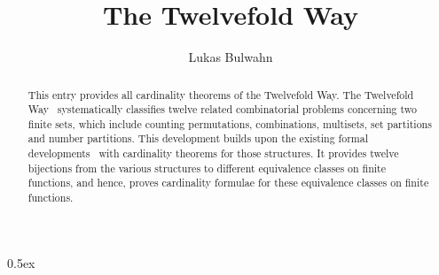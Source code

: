 \documentclass[11pt,a4paper]{article}
\begin{document}
\title{The Twelvefold Way}
\author{Lukas Bulwahn}
\maketitle

\begin{abstract}

This entry provides all cardinality theorems of the Twelvefold Way.
The Twelvefold Way~\cite{bogart-2004, stanley-2012, wikipedia:Twelvefold-Way}
systematically classifies twelve related combinatorial problems
concerning two finite sets, which include
counting permutations, combinations, multisets, set partitions and number partitions.
This development builds upon the existing formal
developments~\cite{Card_Partitions-AFP, Card_Multisets-AFP, Card_Number_Partitions-AFP}
with cardinality theorems for those structures.
It provides twelve bijections from the various structures to
different equivalence classes on finite functions, and hence, proves
cardinality formulae for these equivalence classes on finite functions.
\end{abstract}

\tableofcontents

\parindent 0pt\parskip 0.5ex





\end{document}
